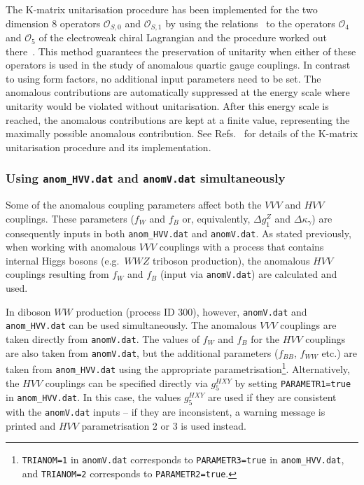 \documentclass[english,12pt]{article}
\begin{document}
The K-matrix unitarisation procedure has been implemented 
for the two dimension 8 operators $\mathcal{O}_{S,0}$ and $\mathcal{O}_{S,1}$
by using the relations~\cite{Degrande:2013rea} to the operators $\mathcal{O}_4$
and $\mathcal{O}_5$ of the electroweak chiral Lagrangian and the procedure
worked out there~\cite{Alboteanu:2008my}.
This method guarantees the preservation of unitarity when either of these operators is used 
in the study of anomalous quartic gauge couplings. In contrast to using form factors,
no additional input parameters need to be set. The anomalous contributions are automatically suppressed
at the energy scale where unitarity would be violated without unitarisation. After this energy scale is reached,
the anomalous contributions are kept at a finite value, representing the maximally possible anomalous contribution.
See Refs.~\cite{Alboteanu:2008my,Degrande:2013rea,Kmatrix,Kilian:2014zja} for details of the K-matrix unitarisation procedure and its implementation.


\subsubsection{Using {\tt anom\_HVV.dat} and {\tt anomV.dat} simultaneously}
\label{sec:HVVandVVV}

Some of the anomalous coupling parameters affect both the $VVV$ and $HVV$ couplings.  
These parameters ($f_{W}$ and $f_{B}$ or, equivalently, $\Delta g_{1}^{Z}$ and 
$\Delta \kappa_{\gamma}$) are consequently inputs in both {\tt anom\_HVV.dat} 
and {\tt anomV.dat}.  As stated previously, when working with anomalous $VVV$ 
couplings with a process that contains internal Higgs bosons (e.g.\ $WWZ$ triboson production), 
the anomalous $HVV$ couplings resulting from $f_{W}$ and $f_{B}$ (input 
via {\tt anomV.dat}) are calculated and used.

In diboson $WW$ production (process ID 300), however, {\tt anomV.dat} and {\tt anom\_HVV.dat} 
can be used simultaneously.  The anomalous $VVV$ couplings are taken directly from {\tt anomV.dat}.  
The values of $f_{W}$ and $f_{B}$ for the $HVV$ couplings are also taken from {\tt anomV.dat}, 
but the additional parameters ($f_{BB}$, $f_{WW}$ etc.) are taken from {\tt anom\_HVV.dat} 
using the appropriate parametrisation\footnote{{\tt TRIANOM=1} in {\tt anomV.dat} corresponds 
to {\tt PARAMETR3=true} in {\tt anom\_HVV.dat}, and {\tt TRIANOM=2} corresponds to {\tt PARAMETR2=true}.}. 
 Alternatively, the $HVV$ couplings can be specified directly via $g_{5}^{HXY}$ by setting 
{\tt PARAMETR1=true} in {\tt anom\_HVV.dat}.  In this case, the values $g_{5}^{HXY}$ are used if 
they are consistent with the {\tt anomV.dat} inputs -- if they are inconsistent, a warning message 
is printed and $HVV$ parametrisation 2 or 3 is used instead.
\end{document}
